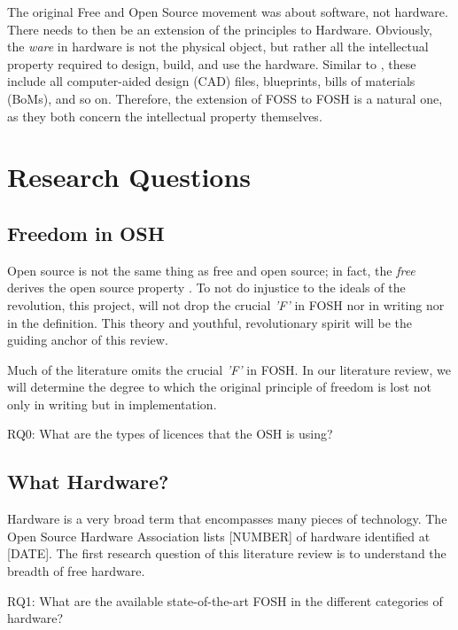 \documentclass[acmtog]{acmart}
\begin{document}
The original Free and Open Source movement was about software, not hardware.
There needs to then be an extension of the principles to Hardware.
Obviously, the \textit{ware} in hardware is not the physical object, but rather all the intellectual property required to design, build, and use the hardware. 
Similar to \cite{p1_def_succ}, these include all computer-aided design (CAD) files, blueprints, bills of materials (BoMs), and so on. 
Therefore, the extension of FOSS to FOSH is a natural one, as they both concern the intellectual property themselves. 

\section{Research Questions}

\subsection{Freedom in OSH}
Open source is not the same thing as free and open source; in fact, the \textit{free} derives the open source property \cite{b0_stallman}. 
To not do injustice to the ideals of the revolution, this project, will not drop the crucial \textit{'F'} in FOSH nor in writing nor in the definition.
This theory and youthful, revolutionary spirit will be the guiding anchor of this review.

Much of the literature omits the crucial \textit{'F'} in FOSH.
In our literature review, we will determine the degree to which the original principle of freedom is lost not only in writing but in implementation.

RQ0: What are the types of licences that the OSH is using?

\subsection{What Hardware?}
\label{RQ1}
Hardware is a very broad term that encompasses many pieces of technology.
The Open Source Hardware Association lists [NUMBER] of hardware identified at [DATE].
The first research question of this literature review is to understand the breadth of free hardware.

RQ1: What are the available state-of-the-art FOSH in the different categories of hardware?
\end{document}
